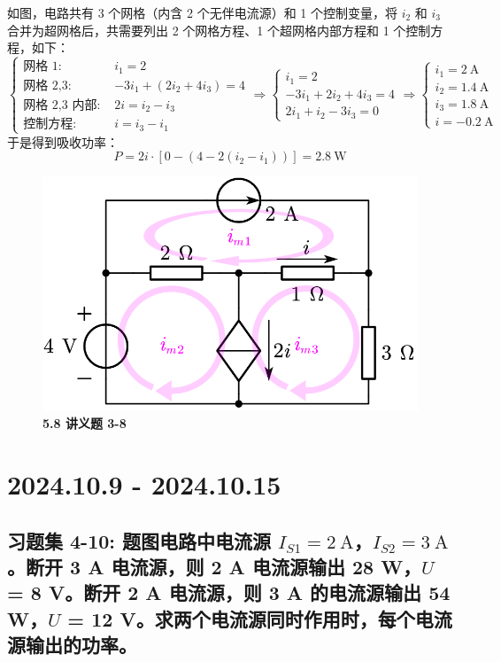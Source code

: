 \documentclass[UTF8]{report}
\theoremstyle{MyLineTheoremStyle} %
\theoremstyle{MyBlockTheoremStyle} %
\theoremstyle{MySubsubsectionStyle} %
\begin{document}
如图，电路共有 3 个网格（内含 2 个无伴电流源）和 1 个控制变量，将 $i_2$ 和 $i_3$ 合并为超网格后，共需要列出 2 个网格方程、1 个超网格内部方程和 1 个控制方程，如下：
\begin{equation}
\begin{cases}
    \text{网格 1: } & i_1 = 2\\ 
    \text{网格 2,3: } & -3i_1 + (2i_2 + 4i_3) = 4\\ 
    \text{网格 2,3 内部: } & 2i = i_2 - i_3\\ 
    \text{控制方程: } & i = i_3 - i_1
\end{cases}\Longrightarrow 
\begin{cases}
    i_1 = 2 \\ 
    -3i_1 + 2i_2 + 4i_3 = 4 \\
    2i_1 + i_2 - 3i_3 = 0
\end{cases}
\Longrightarrow 
\begin{cases}
    i_1 = 2 \ \mathrm{A}\\ 
    i_2 = 1.4 \ \mathrm{A}\\ 
    i_3 = 1.8 \ \mathrm{A} \\ 
    i = -0.2 \ \mathrm{A}
\end{cases}
\end{equation}
于是得到吸收功率：
\begin{equation}
    P = 2i \cdot \left[ 0 - \left(4 - 2(i_2 - i_1)\right) \right] = 2.8 \ \mathrm{W}
\end{equation}

\begin{figure}[H]\centering
\includegraphics[width=0.5\columnwidth]{assets/5/5.8.png}
\caption{\bfseries 5.8 讲义题 3-8}\label{5.8 讲义题 3-8}
\end{figure}




\chapter{2024.10.9 - 2024.10.15}\thispagestyle{fancy}

\section{习题集 4-10: 题图电路中电流源 $I_{S1} = 2 \ \mathrm{A}$，$I_{S2}= 3 \ \mathrm{A}$。断开 3 A 电流源，则 2 A 电流源输出 28 W，$U$ = 8 V。断开 2 A 电流源，则 3 A 的电流源输出 54 W，$U$ = 12 V。求两个电流源同时作用时，每个电流源输出的功率。}
\end{document}
